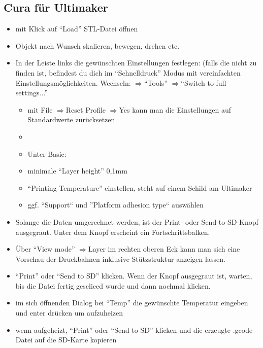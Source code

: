 \documentclass{\basedir/fablab-document}
\newcommand{\ra}{$\Rightarrow$}
\begin{document}
\subsection{Cura für Ultimaker}
\begin{itemize}
\item mit Klick auf ``Load'' STL-Datei öffnen
\item Objekt nach Wunsch skalieren, bewegen, drehen etc.
\item In der Leiste links die gewünschten Einstellungen festlegen: (falls die nicht zu finden ist, befindest du dich im ``Schnelldruck'' Modus mit vereinfachten Einstellungsmöglichkeiten. Wechseln: \ra ``Tools'' \ra ``Switch to full settings...''
 \begin{itemize}
  \item mit File \ra Reset Profile \ra Yes kann man die Einstellungen auf Standardwerte zurücksetzen
  \item {}
  \item Unter Basic:
  \item minimale ``Layer height'' 0,1mm
  \item ``Printing Temperature'' einstellen, steht auf einem Schild am Ultimaker
  \item ggf. ``Support`` und ''Platform adhesion type`` auswählen
 \end{itemize}
\item Solange die Daten umgerechnet werden, ist der Print- oder Send-to-SD-Knopf ausgegraut. Unter dem Knopf erscheint ein Fortschrittsbalken.
\item Über \enquote{View mode} \ra Layer im rechten oberen Eck kann man sich eine Vorschau der Druckbahnen inklusive Stützstruktur anzeigen lassen.
\item ``Print'' oder ``Send to SD'' klicken. Wenn der Knopf ausgegraut ist, warten, bis die Datei fertig gescliced wurde und dann nochmal klicken.
\item im sich öffnenden Dialog bei ``Temp'' die gewünschte Temperatur eingeben und enter drücken um aufzuheizen
\item wenn aufgeheizt, ``Print'' oder ``Send to SD'' klicken und die erzeugte .gcode-Datei auf die SD-Karte kopieren
\end{itemize}
\end{document}
